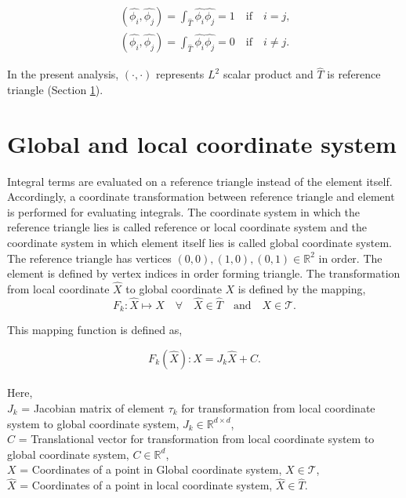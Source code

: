 \documentclass[a4paper,twoside,openright]{book}
\begin{document}
\begin{equation}
\begin{split}
(\hat{\phi_i } , \hat{\phi_j}) = \int_{\hat{T}} \hat{\phi_i} \hat{\phi_j} = 1 \quad \textrm{if} \quad i = j \textrm{,}\\
(\hat{\phi_i } , \hat{\phi_j}) = \int_{\hat{T}} \hat{\phi_i} \hat{\phi_j} = 0 \quad \textrm{if} \quad i \neq j \textrm{.}
\end{split}
\end{equation}

In the present analysis, $(\cdot,\cdot)$ represents $L^2$ scalar product and $\hat{T}$ is reference triangle (Section \ref{section_glob_loc}). 

\section{Global and local coordinate system} \label{section_glob_loc}

Integral terms are evaluated on a reference triangle instead of the element itself. Accordingly, a coordinate transformation between reference triangle and element is performed for evaluating integrals. The coordinate system in which the reference triangle lies is called reference or local coordinate system and the coordinate system in which element itself lies is called global coordinate system. The reference triangle has vertices $(0,0),(1,0),(0,1) \in \mathbb{R}^2$ in order. The element is defined by vertex indices in order forming triangle. The transformation from local coordinate $\hat{X}$ to global coordinate $X$ is defined by the mapping,
\begin{equation}\label{local global mapping}
F_k:\hat{X} \mapsto X \quad \forall \quad \hat{X} \in \hat{T} \quad \textrm{and} \quad X \in \mathcal{T} \textrm{.}
\end{equation}

This mapping function is defined as,

\begin{equation}\label{local global mapping equation}
F_k(\hat{X}): X = J_k \hat{X} + C \textrm{.}
\end{equation}
${}$\\
Here,\\
$J_k$ = Jacobian matrix of element $\tau_k$ for transformation from local coordinate system to global coordinate system, $J_k \in \mathbb{R}^{d \times d}$,\\
$C$ = Translational vector for transformation from local coordinate system to global coordinate system, $C \in \mathbb{R}^d$,\\
$X$ = Coordinates of a point in Global coordinate system, $X \in \mathcal{T}$,\\
$\hat{X}$ = Coordinates of a point in local coordinate system, $\hat{X} \in \hat{T}$.\\
\end{document}
